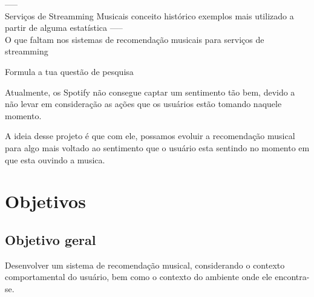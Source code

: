 \documentclass{article}
\begin{document}





----- \\

Serviços de Streamming Musicais
  conceito
  histórico
  exemplos
  mais utilizado a partir de alguma estatística
----- \\







O que faltam nos sistemas de recomendação musicais para serviços de streamming


Formula a tua questão de pesquisa


Atualmente, os Spotify não consegue captar um sentimento tão bem, devido a não levar em consideração as ações que os usuários estão tomando naquele momento. 

A ideia desse projeto é que com ele, possamos evoluir a recomendação musical para algo mais voltado ao sentimento que o usuário esta sentindo no momento em que esta ouvindo a musica.

\newpage

\section{Objetivos}

\subsection{Objetivo geral}

Desenvolver um sistema de recomendação musical, considerando o contexto comportamental do usuário, bem como o contexto do ambiente onde ele encontra-se.
\end{document}
